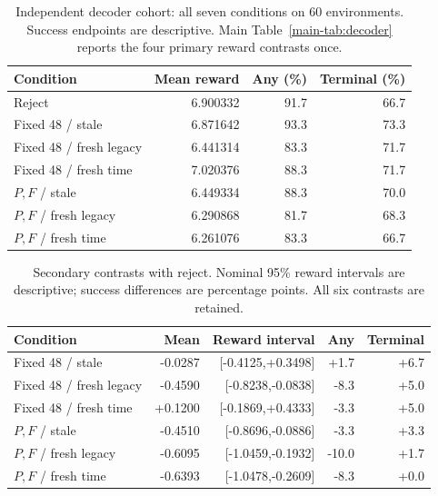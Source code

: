 \begin{table}[H]\centering\small
\caption{Independent decoder cohort: all seven conditions on 60 environments. Success endpoints are descriptive. Main Table~\ref{main-tab:decoder} reports the four primary reward contrasts once.}\label{s-tab:decoder-outcomes}
\begin{tabular}{lrrr}\toprule Condition & Mean reward & Any (\%) & Terminal (\%)\\\midrule
Reject & 6.900332 & 91.7 & 66.7\\
Fixed 48 / stale & 6.871642 & 93.3 & 73.3\\
Fixed 48 / fresh legacy & 6.441314 & 83.3 & 71.7\\
Fixed 48 / fresh time & 7.020376 & 88.3 & 71.7\\
$P,F$ / stale & 6.449334 & 88.3 & 70.0\\
$P,F$ / fresh legacy & 6.290868 & 81.7 & 68.3\\
$P,F$ / fresh time & 6.261076 & 83.3 & 66.7\\
\bottomrule\end{tabular}\end{table}
\begin{table}[H]\centering\small
\caption{Secondary contrasts with reject. Nominal 95\% reward intervals are descriptive; success differences are percentage points. All six contrasts are retained.}\label{s-tab:decoder-reject}
\setlength{\tabcolsep}{3pt}\begin{tabular}{lrrrr}\toprule Condition & Mean & Reward interval & Any & Terminal\\\midrule
Fixed 48 / stale & -0.0287 & [-0.4125,+0.3498] & +1.7 & +6.7\\
Fixed 48 / fresh legacy & -0.4590 & [-0.8238,-0.0838] & -8.3 & +5.0\\
Fixed 48 / fresh time & +0.1200 & [-0.1869,+0.4333] & -3.3 & +5.0\\
$P,F$ / stale & -0.4510 & [-0.8696,-0.0886] & -3.3 & +3.3\\
$P,F$ / fresh legacy & -0.6095 & [-1.0459,-0.1932] & -10.0 & +1.7\\
$P,F$ / fresh time & -0.6393 & [-1.0478,-0.2609] & -8.3 & +0.0\\
\bottomrule\end{tabular}\end{table}
